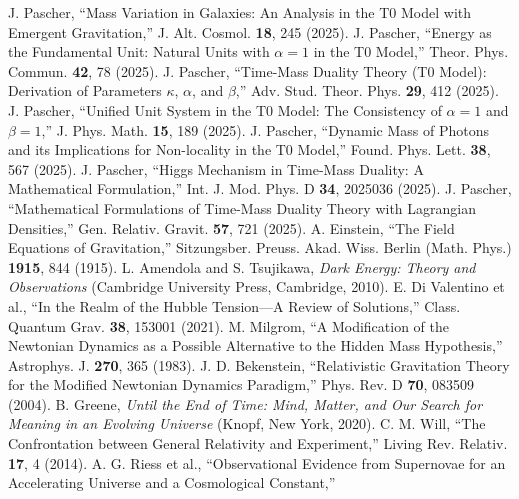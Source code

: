 \documentclass[12pt,a4paper]{article} %
\begin{document}
	
	
	\begin{thebibliography}{99}
		J. Pascher,
		``Mass Variation in Galaxies: An Analysis in the T0 Model with Emergent Gravitation,''
		J. Alt. Cosmol. \textbf{18}, 245 (2025).
		J. Pascher,
		``Energy as the Fundamental Unit: Natural Units with $\alpha = 1$ in the T0 Model,''
		Theor. Phys. Commun. \textbf{42}, 78 (2025).
		J. Pascher,
		``Time-Mass Duality Theory (T0 Model): Derivation of Parameters $\kappa$, $\alpha$, and $\beta$,''
		Adv. Stud. Theor. Phys. \textbf{29}, 412 (2025).
		J. Pascher,
		``Unified Unit System in the T0 Model: The Consistency of $\alpha = 1$ and $\beta = 1$,''
		J. Phys. Math. \textbf{15}, 189 (2025).
		J. Pascher,
		``Dynamic Mass of Photons and its Implications for Non-locality in the T0 Model,''
		Found. Phys. Lett. \textbf{38}, 567 (2025).
		J. Pascher,
		``Higgs Mechanism in Time-Mass Duality: A Mathematical Formulation,''
		Int. J. Mod. Phys. D \textbf{34}, 2025036 (2025).
		J. Pascher,
		``Mathematical Formulations of Time-Mass Duality Theory with Lagrangian Densities,''
		Gen. Relativ. Gravit. \textbf{57}, 721 (2025).
		A. Einstein,
		``The Field Equations of Gravitation,''
		Sitzungsber. Preuss. Akad. Wiss. Berlin (Math. Phys.) \textbf{1915}, 844 (1915).
		L. Amendola and S. Tsujikawa,
		\textit{Dark Energy: Theory and Observations}
		(Cambridge University Press, Cambridge, 2010).
		E. Di Valentino et al.,
		``In the Realm of the Hubble Tension—A Review of Solutions,''
		Class. Quantum Grav. \textbf{38}, 153001 (2021).
		M. Milgrom,
		``A Modification of the Newtonian Dynamics as a Possible Alternative to the Hidden Mass Hypothesis,''
		Astrophys. J. \textbf{270}, 365 (1983).
		J. D. Bekenstein,
		``Relativistic Gravitation Theory for the Modified Newtonian Dynamics Paradigm,''
		Phys. Rev. D \textbf{70}, 083509 (2004).
		B. Greene,
		\textit{Until the End of Time: Mind, Matter, and Our Search for Meaning in an Evolving Universe}
		(Knopf, New York, 2020).
		C. M. Will,
		``The Confrontation between General Relativity and Experiment,''
		Living Rev. Relativ. \textbf{17}, 4 (2014).
		A. G. Riess et al.,
		``Observational Evidence from Supernovae for an Accelerating Universe and a Cosmological Constant,''

\end{thebibliography}
\end{document}
